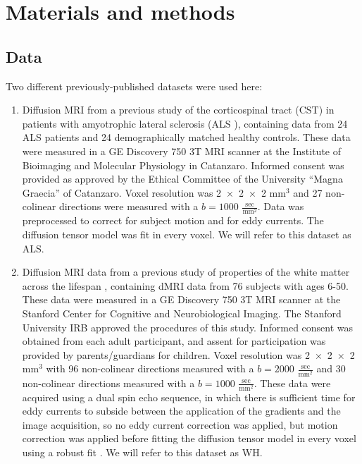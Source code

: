 \section*{Materials and methods}

\subsection*{Data}

Two different previously-published datasets were used here:

\begin{enumerate}

\item Diffusion MRI from a previous study of the corticospinal
tract (CST) in patients with amyotrophic lateral sclerosis
(ALS \cite{sarica2017corticospinal}), containing data from 24 ALS
patients and 24 demographically matched healthy controls. These data
were measured in a GE Discovery 750 3T MRI scanner at the Institute
of Bioimaging and Molecular Physiology in Catanzaro. Informed consent
was provided as approved by the Ethical Committee of the University
``Magna Graecia'' of Catanzaro. Voxel resolution was \num{2x2x2}
$\text{mm}^3$ and 27 non-colinear directions were measured with a
$b=1000$ $\frac{\text{sec}}{\text{mm}^2}$. Data was preprocessed to 
correct for subject motion and for eddy currents. The diffusion tensor
model \cite{basser1994mr} was fit in every voxel.
We will refer to this dataset as ALS.

\item Diffusion MRI data from a previous study of properties of
the white matter across the lifespan \cite{yeatman2014lifespan},
containing dMRI data from 76 subjects with ages 6-50. These data were
measured in a GE Discovery 750 3T MRI scanner at the Stanford Center
for Cognitive and Neurobiological Imaging. The Stanford University
IRB approved the procedures of this study. Informed consent was
obtained from each adult participant, and assent for participation
was provided by parents/guardians for children. Voxel resolution was
\num{2x2x2}$\text{mm}^3$ with 96 non-colinear directions measured with a
$b=2000$ $\frac{\text{sec}}{\text{mm}^2}$ and 30 non-colinear directions
measured with a $b=1000$ $\frac{\text{sec}}{\text{mm}^2}$. These data
were acquired using a dual spin echo sequence, in which there is
sufficient time for eddy currents to subside between the application of
the gradients and the image acquisition, so no eddy current correction
was applied, but motion correction was applied before fitting the
diffusion tensor model \cite{basser1994mr} in every voxel using a robust
fit \cite{chang2005restore}. We will refer to this dataset as WH.

\end{enumerate}

